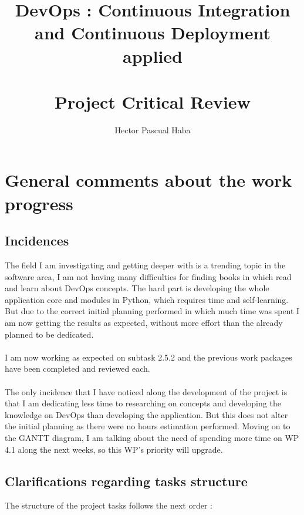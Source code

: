 \documentclass[a4paper]{article}
\title{\textbf{DevOps : Continuous Integration and Continuous Deployment applied} \\~\\
\large \textbf{Project Critical Review}}
\author{Hector Pascual Haba}
\begin{document}
\maketitle 

\section{General comments about the work progress}

\subsection{Incidences}

The field I am investigating and getting deeper with is a trending topic in the software area, I am not having many difficulties for finding books in which read and learn about DevOps concepts. The hard part is developing the whole application core and modules in Python, which requires time and self-learning. But due to the correct initial planning performed in which much time was spent I am now getting the results as expected, without more effort than the already planned to be dedicated.
\\~\\
I am now working as expected on subtask 2.5.2 and the previous work packages have been completed and reviewed each.
\\~\\
The only incidence that I have noticed along the development of the project is that I am dedicating less time to researching on concepts and developing the knowledge on DevOps than developing the application. But this does not alter the initial planning as there were no hours estimation performed. Moving on to the GANTT diagram, I am talking about the need of spending more time on WP 4.1 along the next weeks, so this WP's priority will upgrade.

\subsection{Clarifications regarding tasks structure}

The structure of the project tasks follows the next order :
\end{document}
